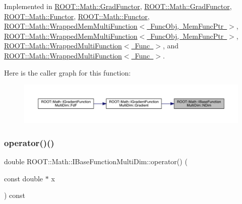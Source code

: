 Implemented in \mbox{\hyperlink{classROOT_1_1Math_1_1GradFunctor_a7ff4ed4ad6f7c17d74403a443990f069}{R\+O\+O\+T\+::\+Math\+::\+Grad\+Functor}}, \mbox{\hyperlink{classROOT_1_1Math_1_1GradFunctor_a7ff4ed4ad6f7c17d74403a443990f069}{R\+O\+O\+T\+::\+Math\+::\+Grad\+Functor}}, \mbox{\hyperlink{classROOT_1_1Math_1_1Functor_a2544e2ed3c6a0420084c7b08eb3c3130}{R\+O\+O\+T\+::\+Math\+::\+Functor}}, \mbox{\hyperlink{classROOT_1_1Math_1_1Functor_a2544e2ed3c6a0420084c7b08eb3c3130}{R\+O\+O\+T\+::\+Math\+::\+Functor}}, \mbox{\hyperlink{classROOT_1_1Math_1_1WrappedMemMultiFunction_ae9aaf3de1f2e1e6e1c1310fccdb06009}{R\+O\+O\+T\+::\+Math\+::\+Wrapped\+Mem\+Multi\+Function$<$ Func\+Obj, Mem\+Func\+Ptr $>$}}, \mbox{\hyperlink{classROOT_1_1Math_1_1WrappedMemMultiFunction_ae9aaf3de1f2e1e6e1c1310fccdb06009}{R\+O\+O\+T\+::\+Math\+::\+Wrapped\+Mem\+Multi\+Function$<$ Func\+Obj, Mem\+Func\+Ptr $>$}}, \mbox{\hyperlink{classROOT_1_1Math_1_1WrappedMultiFunction_a99de9f7a6e26b03b1cdcf35d8c62d761}{R\+O\+O\+T\+::\+Math\+::\+Wrapped\+Multi\+Function$<$ Func $>$}}, and \mbox{\hyperlink{classROOT_1_1Math_1_1WrappedMultiFunction_a99de9f7a6e26b03b1cdcf35d8c62d761}{R\+O\+O\+T\+::\+Math\+::\+Wrapped\+Multi\+Function$<$ Func $>$}}.

Here is the caller graph for this function\+:\nopagebreak
\begin{figure}[H]
\begin{center}
\leavevmode
\includegraphics[width=350pt]{d0/d87/classROOT_1_1Math_1_1IBaseFunctionMultiDim_a16f37dc7a6d00c75ddeda0697741315d_icgraph}
\end{center}
\end{figure}
\mbox{\label{classROOT_1_1Math_1_1IBaseFunctionMultiDim_a7efd1892dc6473b3f8aaaff3cbb8bb2f}} 
\subsubsection{\texorpdfstring{operator()()}{operator()()}\hspace{0.1cm}{\footnotesize\ttfamily [1/2]}}
{\footnotesize\ttfamily double R\+O\+O\+T\+::\+Math\+::\+I\+Base\+Function\+Multi\+Dim\+::operator() (\begin{DoxyParamCaption}\item[{const double $\ast$}]{x }\end{DoxyParamCaption}) const\hspace{0.3cm}{\ttfamily [inline]}}

